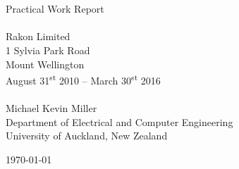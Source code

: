 \begin{titlepage}
\begin{center}

\\~\\\vspace{3cm}
{\huge Practical Work Report}\\[2cm]

\HRule \\[0.5cm]
{\LARGE Rakon Limited}\\[0.3cm]
{\large 1 Sylvia Park Road\\
Mount Wellington}\\[0.3cm]
August 31\textsuperscript{st} 2010 -- March 30\textsuperscript{st} 2016\\[0.3cm]
\HRule \\[2cm]

{\large Michael Kevin Miller}\\[0.5cm]
Department of Electrical and Computer Engineering\\[0.2cm]
University of Auckland, New Zealand

\vfill
{\large \today}

\end{center}
\end{titlepage}

